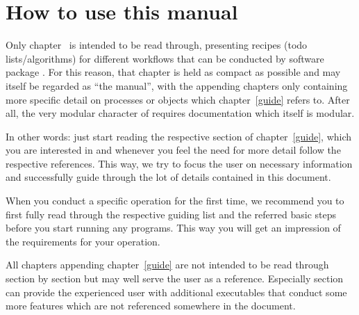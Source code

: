 
%
%
%
%
\section*{How to use this manual}
%
Only chapter~ is intended to be read through, presenting recipes (todo lists/algorithms)
for different workflows that can be conducted by software package \ASKI{}.
For this reason, that chapter is held as compact 
as possible and may itself be regarded as ``the manual'', with the appending chapters only 
containing more specific detail on processes or objects which chapter~\ref{guide} refers to.
After all, the very modular character of \ASKI{} requires documentation which itself is modular.

In other words: just start reading the respective section of chapter~\ref{guide}, which you are interested in 
and whenever you feel the need for more detail follow the respective references. This way, we try to focus
the user on necessary information and successfully guide through the lot of details contained in this document. 

When you conduct a specific \ASKI{} operation for the first time, we recommend you to first fully read through the 
respective guiding list and the referred basic steps before you start running any programs. This way you will 
get an impression of the requirements for your operation.

All chapters appending chapter~\ref{guide} are not intended to be read through section by section but may well
serve the user as a reference. Especially section~ can provide the 
experienced user with additional executables that conduct some more features which are not referenced somewhere
in the document.

